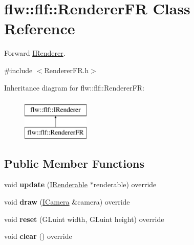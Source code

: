 \hypertarget{classflw_1_1flf_1_1RendererFR}{}\section{flw\+:\+:flf\+:\+:Renderer\+FR Class Reference}
\label{classflw_1_1flf_1_1RendererFR}


Forward \hyperlink{classflw_1_1flf_1_1IRenderer}{I\+Renderer}.  




{\ttfamily \#include $<$Renderer\+F\+R.\+h$>$}

Inheritance diagram for flw\+:\+:flf\+:\+:Renderer\+FR\+:\begin{figure}[H]
\begin{center}
\leavevmode
\includegraphics[height=2.000000cm]{classflw_1_1flf_1_1RendererFR}
\end{center}
\end{figure}
\subsection*{Public Member Functions}
\begin{DoxyCompactItemize}
\item 
\mbox{\label{classflw_1_1flf_1_1RendererFR_a773c729d0eb227ccb9d3ee22ce879922}} 
void {\bfseries update} (\hyperlink{classflw_1_1flf_1_1IRenderable}{I\+Renderable} $\ast$renderable) override
\item 
\mbox{\label{classflw_1_1flf_1_1RendererFR_a607600cb2090632d62f10ae78d3f474f}} 
void {\bfseries draw} (\hyperlink{classflw_1_1flf_1_1ICamera}{I\+Camera} \&camera) override
\item 
\mbox{\label{classflw_1_1flf_1_1RendererFR_a1b001f7f804fe46d4ce0b1bebd649eeb}} 
void {\bfseries reset} (G\+Luint width, G\+Luint height) override
\item 
\mbox{\label{classflw_1_1flf_1_1RendererFR_a74c14e50b6e6477a7e9fb2e129cf2cf6}} 
void {\bfseries clear} () override
\end{DoxyCompactItemize}
